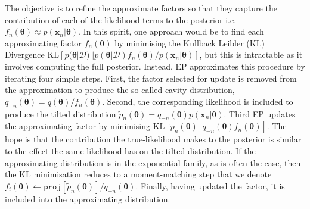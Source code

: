 The objective is to refine the approximate factors so that they capture the contribution of each of the likelihood terms to the posterior i.e.~$f_n(\bm{\theta}) \approx p(\bm{x}_n | \bm{\theta})$. In this spirit, one approach would be to find each approximating factor $f_n(\bm{\theta})$ by minimising the Kullback Leibler (KL) Divergence $\mathrm{KL}[p(\bm{\theta}|\mathcal{D}) || p(\bm{\theta}|\mathcal{D}) f_n(\bm{\theta})/ p(\bm{x}_n | \bm{\theta})]$, but this is intractable as it involves computing the full posterior. Instead, EP approximates this procedure by iterating four simple steps. First, the factor selected for update is removed from the approximation to produce the so-called cavity distribution, $q_{-n}(\bm{\theta}) =q(\bm{\theta})/f_n(\bm{\theta})$. Second, the corresponding likelihood is included to produce the tilted distribution $\tilde{p}_n(\bm{\theta}) = q_{-n}(\bm{\theta}) p(\bm{x}_n | \bm{\theta})$. Third EP updates the approximating factor by minimising $\mathrm{KL}[\tilde{p}_n(\bm{\theta}) || q_{-n}(\bm{\theta})  f_n(\bm{\theta})]$. The hope is that the contribution the true-likelihood makes to the posterior is similar to the effect the same likelihood has on the tilted distribution. If the approximating distribution is in the exponential family, as is often the case, then the KL minimisation reduces to a moment-matching step \cite{amari:ig} that we denote $f_i(\bm{\theta}) \leftarrow \mathtt{proj}[\tilde{p}_n(\bm{\theta})] / q_{-n}(\bm{\theta}) $. Finally, having updated the factor, it is included into the approximating distribution.
%
%
%
%
%


